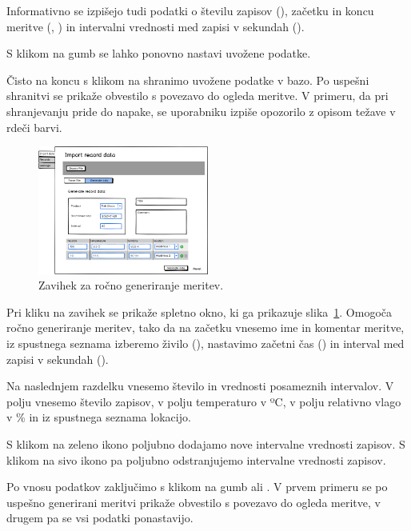 \documentclass[a4paper, 12pt]{book}
\begin{document}
Informativno se izpišejo tudi podatki o številu zapisov (), začetku in koncu meritve (, ) in intervalni vrednosti med zapisi v sekundah (). 

S klikom na gumb  se lahko ponovno nastavi uvožene podatke.

Čisto na koncu s klikom na  shranimo uvožene podatke v bazo. Po uspešni shranitvi se prikaže obvestilo s povezavo do ogleda meritve. V primeru, da pri shranjevanju pride do napake, se uporabniku izpiše opozorilo z opisom težave v rdeči barvi.

\begin{figure}[h]
\begin{center}
\includegraphics[width=0.5\textwidth]{slike/Import-data-Generate.png}
\end{center}
\caption{Zavihek  za ročno generiranje meritev.}
\label{generate-data-wireframe}
\end{figure}

Pri kliku na zavihek  se prikaže spletno okno, ki ga prikazuje slika~\ref{generate-data-wireframe}. Omogoča ročno generiranje meritev, tako da na začetku vnesemo ime in komentar meritve, iz spustnega seznama izberemo živilo (), nastavimo začetni čas () in interval med zapisi v sekundah ().

Na naslednjem razdelku vnesemo število in vrednosti posameznih intervalov. V polju  vnesemo število zapisov, v polju  temperaturo v ºC, v polju  relativno vlago v \% in iz spustnega seznama  lokacijo.

S klikom na zeleno ikono  poljubno dodajamo nove intervalne vrednosti zapisov. 
S klikom na sivo ikono  pa poljubno odstranjujemo intervalne vrednosti zapisov.

Po vnosu podatkov zaključimo s klikom na gumb  ali . V prvem primeru se po uspešno generirani meritvi prikaže obvestilo s povezavo do ogleda meritve, v drugem pa se vsi podatki ponastavijo.
\end{document}
